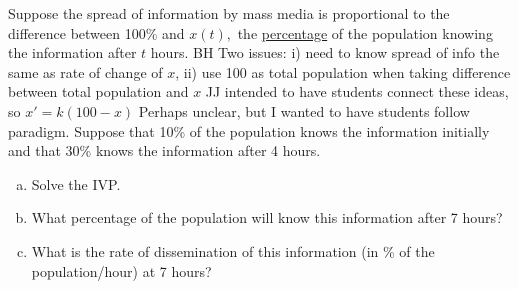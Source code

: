 \documentclass[12pt]{book}
\begin{document}

\begin{exercise}
{\color{blue}
Suppose the spread of information by mass media is proportional to the difference between 100\%  and $x(t),$ the \underline{percentage} of the population knowing the information after $t$ hours.}
{\color{teal}BH Two issues: i) need to know spread of info the same as rate of change of $x$, ii) use 100 as total population when taking difference between total population and $x$ JJ intended to have students connect these ideas, so $x'=k(100-x)$ Perhaps unclear, but I wanted to have students follow paradigm.}
Suppose that 10\% of the population
knows the information initially and that 30\% knows the information after 4 hours.
\begin{enumerate}[a)]
    \item Solve the IVP.
    \item What percentage of the population will know this information after 7 hours?
    \item What is the rate of dissemination of this information (in \% of the population/hour) at 7 hours?
\end{enumerate}

\end{exercise}

\end{document}
